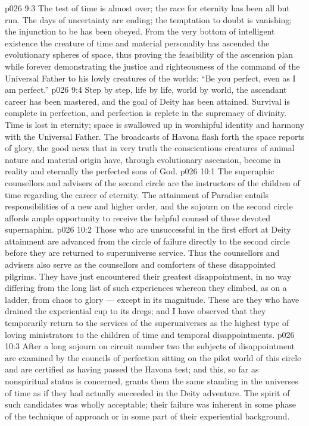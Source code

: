 \vs p026 9:3 \pc The test of time is almost over; the race for eternity has been all but run. The days of uncertainty are ending; the temptation to doubt is vanishing; the injunction to be  has been obeyed. From the very bottom of intelligent existence the creature of time and material personality has ascended the evolutionary spheres of space, thus proving the feasibility of the ascension plan while forever demonstrating the justice and righteousness of the command of the Universal Father to his lowly creatures of the worlds: “Be you perfect, even as I am perfect.”
\vs p026 9:4 Step by step, life by life, world by world, the ascendant career has been mastered, and the goal of Deity has been attained. Survival is complete in perfection, and perfection is replete in the supremacy of divinity. Time is lost in eternity; space is swallowed up in worshipful identity and harmony with the Universal Father. The broadcasts of Havona flash forth the space reports of glory, the good news that in very truth the conscientious creatures of animal nature and material origin have, through evolutionary ascension, become in reality and eternally the perfected sons of God.
\vs p026 10:1 The superaphic counsellors and advisers of the second circle are the instructors of the children of time regarding the career of eternity. The attainment of Paradise entails responsibilities of a new and higher order, and the sojourn on the second circle affords ample opportunity to receive the helpful counsel of these devoted supernaphim.
\vs p026 10:2 \pc Those who are unsuccessful in the first effort at Deity attainment are advanced from the circle of failure directly to the second circle before they are returned to superuniverse service. Thus the counsellors and advisers also serve as the counsellors and comforters of these disappointed pilgrims. They have just encountered their greatest disappointment, in no way differing from the long list of such experiences whereon they climbed, as on a ladder, from chaos to glory --- except in its magnitude. These are they who have drained the experiential cup to its dregs; and I have observed that they temporarily return to the services of the superuniverses as the highest type of loving ministrators to the children of time and temporal disappointments.
\vs p026 10:3 After a long sojourn on circuit number two the subjects of disappointment are examined by the councils of perfection sitting on the pilot world of this circle and are certified as having passed the Havona test; and this, so far as nonspiritual status is concerned, grants them the same standing in the universes of time as if they had actually succeeded in the Deity adventure. The spirit of such candidates was wholly acceptable; their failure was inherent in some phase of the technique of approach or in some part of their experiential background.
